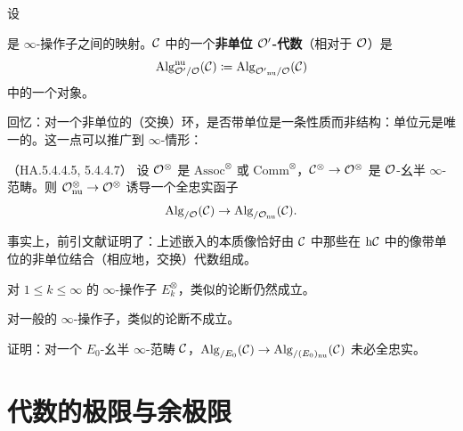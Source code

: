 \begin{definition}\label{L22-4.5}
设
\begin{center}
\end{center}
是 $\infty$-操作子之间的映射。$\mathcal{C}$ 中的一个\textbf{非单位 $\mathcal{O}'$-代数}（相对于 $\mathcal{O}$）是
\[
\operatorname{Alg}^{\mathrm{nu}}_{{\mathcal{O}'}/\mathcal{O}}(\mathcal{C})\coloneqq\operatorname{Alg}_{{\mathcal{O}'}_{\mathrm{nu}}/\mathcal{O}}(\mathcal{C})
\]
中的一个对象。
\end{definition}

\nitem\label{L22-4.6} 回忆：对一个非单位的（交换）环，是否带单位是一条性质而非结构：单位元是唯一的。这一点可以推广到 $\infty$-情形：

\begin{theorem}\label{L22-4.7}（HA.5.4.4.5, 5.4.4.7）
设 $\mathcal{O}^{\otimes}$ 是 $\mathrm{Assoc}^{\otimes}$ 或 $\mathrm{Comm}^{\otimes}$，$\mathcal{C}^{\otimes}\to\mathcal{O}^{\otimes}$ 是 $\mathcal{O}$-幺半 $\infty$-范畴。则 $\mathcal{O}^{\otimes}_{\mathrm{nu}}\to\mathcal{O}^{\otimes}$ 诱导一个全忠实函子
\[
\operatorname{Alg}_{/\mathcal{O}}(\mathcal{C})\to\operatorname{Alg}_{/\mathcal{O}_{\mathrm{nu}}}(\mathcal{C}).
\]
\end{theorem}

\begin{remark}\label{L22-4.8}
事实上，前引文献证明了：上述嵌入的本质像恰好由 $\mathcal{C}$ 中那些在 $\mathrm{h}\mathcal{C}$ 中的像带单位的非单位结合（相应地，交换）代数组成。
\end{remark}

\begin{remark}\label{L22-4.9}
对 $1\le k\le\infty$ 的 $\infty$-操作子 $E_{k}^{\otimes}$，类似的论断仍然成立。
\end{remark}

\begin{warning}\label{L22-4.10}
对一般的 $\infty$-操作子，类似的论断不成立。
\end{warning}

\begin{exercise}\label{L22-4.11}
证明：对一个 $E_{0}$-幺半 $\infty$-范畴 $\mathcal{C}$，$\operatorname{Alg}_{/E_{0}}(\mathcal{C})\to\operatorname{Alg}_{/(E_{0})_{\mathrm{nu}}}(\mathcal{C})$ 未必全忠实。
\end{exercise}

\section{代数的极限与余极限}

